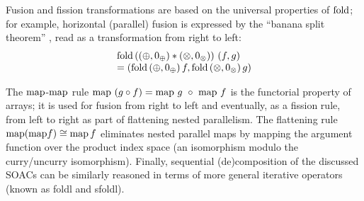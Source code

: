 Fusion and fission transformations are based on the universal
properties of $\mathrm{fold}$; for example, horizontal (parallel) fusion is
expressed by the ``banana split theorem'' \cite{mfp91}, read as a
transformation from right to left:
\[
   \begin{array}{l}
  \mathrm{fold}\, ((\oplus, 0_{\oplus}) * (\otimes, 0_{\otimes})) ~ (f, g) \\=(\mathrm{fold}\, (\oplus, 0_{\oplus})\, f, \mathrm{fold}\, (\otimes,
     0_{\otimes})\, g )
   \end{array}
\]

The $\mathrm{map}$-$\mathrm{map}$ rule $\mathrm{map} ~ (g \circ f) = \mathrm{map} ~ g ~ \circ ~ \mathrm{map} ~ f$
is the functorial property of arrays; it is used for fusion from right
to left and eventually, as a fission rule, from left to right as part
of flattening nested parallelism.
%
The flattening rule
$ \mathrm{map} (\mathrm{map} f) \cong \mathrm{map} \,f$
eliminates nested parallel maps by mapping the argument function over
the product index space (an isomorphism modulo the
curry/uncurry isomorphism).
Finally, sequential (de)composition of the discussed SOACs
can be similarly reasoned in terms of more general iterative operators
(known as foldl and sfoldl).


